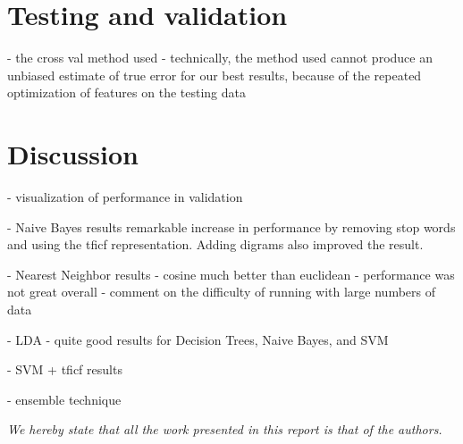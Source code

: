 \documentclass[conference,letterpaper]{IEEEtran}
\begin{document}
\section{Testing and validation}
- the cross val method used
- technically, the method used cannot produce an unbiased estimate of true
	error for our best results, because of the repeated optimization
	of features on the testing data


\section{Discussion}

- visualization of performance in validation

- Naive Bayes results
	remarkable increase in performance by removing stop words and using the
	tficf representation.  Adding digrams also improved the result.

- Nearest Neighbor results
	- cosine much better than euclidean
	- performance was not great overall
	- comment on the difficulty of running with large numbers of data

- LDA
	- quite good results for Decision Trees, Naive Bayes, and SVM

- SVM + tficf results

- ensemble technique

\begin{center}
	\textit{
		We hereby state that all the work presented in this report is 
		that of the authors.
	}
\end{center}


\end{document}

